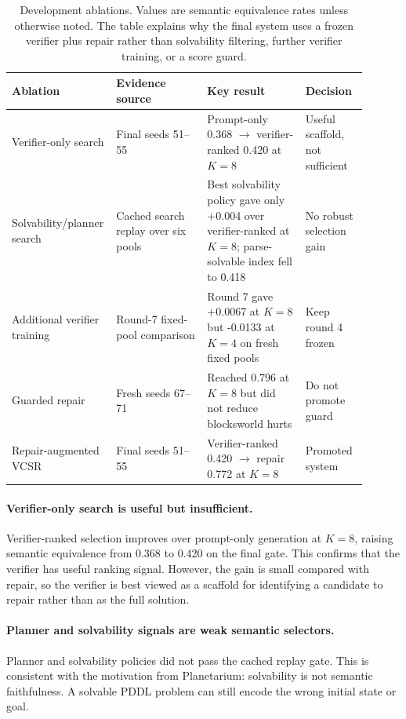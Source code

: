 \documentclass[11pt]{article}
\newcommand{\vcsr}{\textsc{VCSR}\xspace}
\newcommand{\pddl}{\textsc{PDDL}\xspace}
\begin{document}
\begin{table}[t]
\centering
\footnotesize
\setlength{\tabcolsep}{3pt}
\begin{tabular}{@{}p{0.21\linewidth}p{0.25\linewidth}p{0.27\linewidth}p{0.17\linewidth}@{}}
\toprule
Ablation & Evidence source & Key result & Decision \\
\midrule
Verifier-only search & Final seeds 51--55 & Prompt-only 0.368 $\rightarrow$ verifier-ranked 0.420 at $K=8$ & Useful scaffold, not sufficient \\
Solvability/planner search & Cached search replay over six pools & Best solvability policy gave only +0.004 over verifier-ranked at $K=8$; parse-solvable index fell to 0.418 & No robust selection gain \\
Additional verifier training & Round-7 fixed-pool comparison & Round 7 gave +0.0067 at $K=8$ but -0.0133 at $K=4$ on fresh fixed pools & Keep round 4 frozen \\
Guarded repair & Fresh seeds 67--71 & Reached 0.796 at $K=8$ but did not reduce blocksworld hurts & Do not promote guard \\
Repair-augmented \vcsr & Final seeds 51--55 & Verifier-ranked 0.420 $\rightarrow$ repair 0.772 at $K=8$ & Promoted system \\
\bottomrule
\end{tabular}
\caption{Development ablations. Values are semantic equivalence rates unless
otherwise noted. The table explains why the final system uses a frozen verifier
plus repair rather than solvability filtering, further verifier training, or a
score guard.}
\label{tab:ablations}
\end{table}

\paragraph{Verifier-only search is useful but insufficient.}
Verifier-ranked selection improves over prompt-only generation at $K=8$,
raising semantic equivalence from 0.368 to 0.420 on the final gate. This
confirms that the verifier has useful ranking signal. However, the gain is
small compared with repair, so the verifier is best viewed as a scaffold for
identifying a candidate to repair rather than as the full solution.

\paragraph{Planner and solvability signals are weak semantic selectors.}
Planner and solvability policies did not pass the cached replay gate. This is
consistent with the motivation from Planetarium: solvability is not semantic
faithfulness. A solvable \pddl problem can still encode the wrong initial state
or goal.
\end{document}

